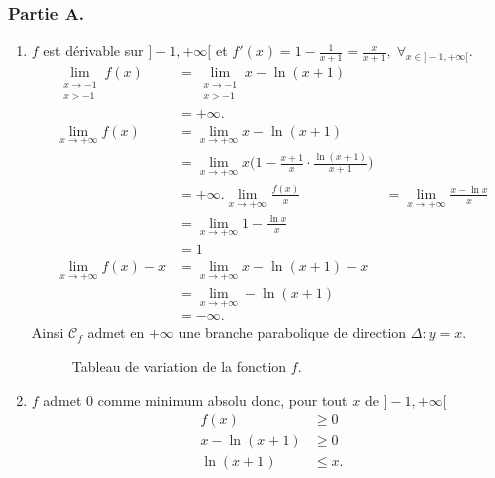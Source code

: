 \documentclass{article}
\begin{document}
\subsubsection*{Partie A.}
\begin{enumerate}
	\item $f$ est dérivable sur $]-1,+\infty[$ et $f'(x)=1-\frac{1}{x+1}=\frac{x}{x+1}, \;\forall_{x\in]-1,+\infty[}$.
	\begin{align*}
		\lim_{\substack{x\to-1 \\ x>-1}}f(x)&=\lim_{\substack{x\to-1 \\ x>-1}}x-\ln(x+1)\\
		&=+\infty.\\
		\lim_{x\to+\infty}f(x)&=\lim_{x\to+\infty}x-\ln(x+1)\\
		&=\lim_{x\to+\infty}x\Big(1-\frac{x+1}{x}\cdot\frac{\ln(x+1)}{x+1}\Big)\\
		&=+\infty.
		\lim_{x\to+\infty}\frac{f(x)}{x}&=\lim_{x\to+\infty}\frac{x-\ln x}{x}\\
		&=\lim_{x\to+\infty}1-\frac{\ln x}{x}\\
		&=1\\
		\lim_{x\to+\infty}f(x)-x&=\lim_{x\to+\infty}x-\ln(x+1)-x\\
		&=\lim_{x\to+\infty}-\ln(x+1)\\
		&=-\infty.
	\end{align*}
	Ainsi $\mathcal{C}_f$ admet en $+\infty$ une branche parabolique de direction $\Delta:y=x$. 
	\begin{figure}[h!]
	\centering
	\caption{Tableau de variation de la fonction $f$.}
	\end{figure}
	\item $f$ admet $0$ comme minimum absolu donc, pour tout $x$ de $]-1,+\infty[$
	\begin{align*}
		f(x)&\geq0\\
		x-\ln(x+1)&\geq0\\
		\ln(x+1)&\leq x.
	\end{align*}
	\begin{figure}[h!]
	\centering
\end{figure}
\end{enumerate}
\end{document}

